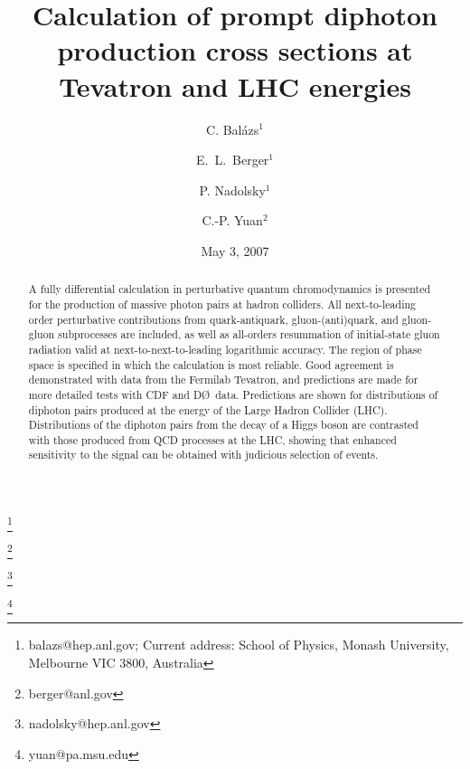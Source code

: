 \documentclass[12pt,english,aps,preprint,prd,letterpaper,fleqn,nofootinbib,showpacs,showkeys,tightenlines,floatfix]{revtex4}
\begin{document}
\newcommand{\barl}{\bar{\lambda}} \newcommand{\barp}{\bar{p}}




\title{Calculation of prompt diphoton production cross sections at Tevatron
and LHC energies}


\author{C. Bal\'{a}zs$^{1}$}


\thanks{balazs@hep.anl.gov; Current address: School of Physics, Monash University, Melbourne VIC 3800, Australia}


\author{E.~L.~Berger$^{1}$}


\thanks{berger@anl.gov}


\author{P. Nadolsky$^{1}$}


\thanks{nadolsky@hep.anl.gov}


\author{C.-P. Yuan$^{2}$}


\thanks{yuan@pa.msu.edu}



\begin{abstract}
A fully differential calculation in perturbative quantum 
chromodynamics is presented for the production of massive photon pairs at hadron 
colliders. All next-to-leading order perturbative contributions from quark-antiquark, 
gluon-(anti)quark, and gluon-gluon subprocesses are included, as well as all-orders 
resummation of initial-state gluon radiation valid at next-to-next-to-leading 
logarithmic accuracy.  The region of phase space is specified in which 
the calculation is most reliable. Good agreement is demonstrated with data from 
the Fermilab Tevatron, and predictions are made for more detailed tests with CDF and
D\O~data.  Predictions are shown for distributions of diphoton pairs
produced at the energy of the Large Hadron Collider (LHC).  Distributions of the 
diphoton pairs from the decay of a Higgs boson are contrasted with those 
produced from QCD processes at the LHC, showing that enhanced sensitivity to 
the signal can be obtained with judicious selection of events.  
\end{abstract}

\date{May 3, 2007}




\end{document}
